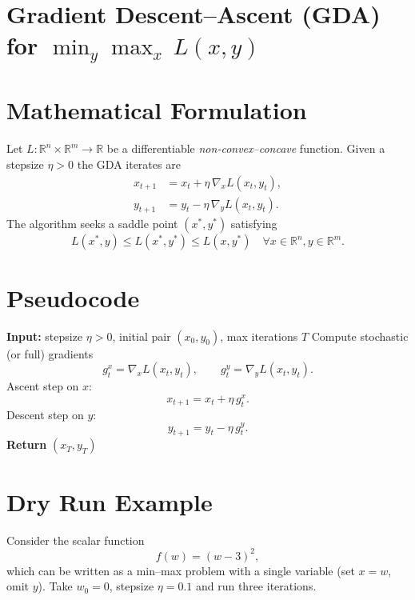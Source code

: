 \documentclass{article}
\newcommand{\R}{\mathbb{R}}
\begin{document}
\section*{Gradient Descent--Ascent (GDA) for \(\displaystyle\min_{y}\max_{x}\,L(x,y)\)}

\section*{Mathematical Formulation}
Let \(L:\R^{n}\times\R^{m}\rightarrow\R\) be a differentiable \emph{non‑convex–concave} function.  
Given a stepsize \(\eta>0\) the GDA iterates are
\[
\boxed{
\begin{aligned}
x_{t+1} &= x_{t} + \eta\,\nabla_{x}L(x_{t},y_{t}) ,\\[4pt]
y_{t+1} &= y_{t} - \eta\,\nabla_{y}L(x_{t},y_{t}) .
\end{aligned}}
\tag{1}
\]
The algorithm seeks a saddle point \((x^{*},y^{*})\) satisfying
\[
L(x^{*},y)\le L(x^{*},y^{*})\le L(x,y^{*})\quad\forall x\in\R^{n},y\in\R^{m}.
\]

\section*{Pseudocode}
\begin{algorithm}[H]
\caption{Gradient Descent–Ascent (GDA)}\label{alg:GDA}
\begin{algorithmic}[1]
\STATE \textbf{Input:} stepsize \(\eta>0\), initial pair \((x_{0},y_{0})\), max iterations \(T\)
    \STATE Compute stochastic (or full) gradients
    \[
    g^{x}_{t}= \nabla_{x}L(x_{t},y_{t}),\qquad 
    g^{y}_{t}= \nabla_{y}L(x_{t},y_{t}) .
    \]
    \STATE Ascent step on \(x\):
    \[
    x_{t+1}= x_{t}+ \eta\, g^{x}_{t}.
    \]
    \STATE Descent step on \(y\):
    \[
    y_{t+1}= y_{t}- \eta\, g^{y}_{t}.
    \]
\ENDFOR
\STATE \textbf{Return} \((x_{T},y_{T})\)
\end{algorithmic}
\end{algorithm}

\section*{Dry Run Example}
Consider the scalar function 
\[
f(w)= (w-3)^{2},
\]
which can be written as a min–max problem with a single variable (set \(x=w\), omit \(y\)).  
Take \(w_{0}=0\), stepsize \(\eta=0.1\) and run three iterations.
\end{document}
